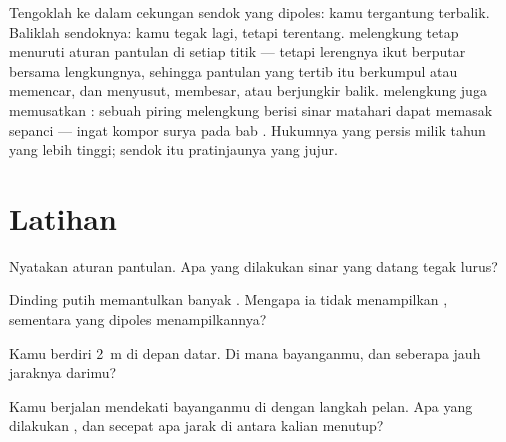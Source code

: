 \begin{remark}\label{rem:g5:mirrors-reflection:curved}
Tengoklah ke dalam cekungan sendok yang dipoles: kamu tergantung
terbalik. Baliklah sendoknya: kamu tegak lagi, tetapi terentang.
 melengkung tetap menuruti aturan pantulan di setiap titik ---
tetapi lerengnya ikut berputar bersama lengkungnya, sehingga pantulan
yang tertib itu berkumpul atau memencar, dan  menyusut,
membesar, atau berjungkir balik.  melengkung juga memusatkan
: sebuah piring melengkung berisi sinar matahari dapat memasak
sepanci --- ingat kompor surya pada bab . Hukumnya yang persis
milik tahun yang lebih tinggi; sendok itu pratinjaunya yang jujur.
\end{remark}

\section{Latihan}

\begin{exercise}[$\star$]\label{exo:g5:mirrors-reflection:1}
Nyatakan aturan pantulan. Apa yang dilakukan sinar yang datang tegak
lurus?
\end{exercise}

\begin{exercise}[$\star$]\label{exo:g5:mirrors-reflection:2}
Dinding putih memantulkan banyak . Mengapa ia tidak menampilkan
, sementara  yang dipoles menampilkannya?
\end{exercise}

\begin{exercise}[$\star$]\label{exo:g5:mirrors-reflection:3}
Kamu berdiri \qty{2}{m} di depan  datar. Di mana bayanganmu, dan
seberapa jauh jaraknya darimu?
\end{exercise}

\begin{exercise}[$\star$]\label{exo:g5:mirrors-reflection:4}
Kamu berjalan mendekati bayanganmu di  dengan langkah pelan. Apa
yang dilakukan , dan secepat apa jarak di antara kalian
menutup?
\end{exercise}

